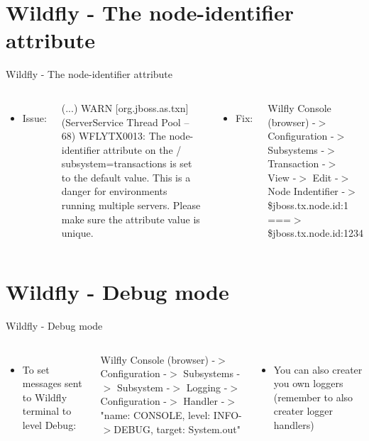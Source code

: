 \documentclass[aspectratio=1610,english]{beamer} %
\begin{document}
  	\section{Wildfly - The node-identifier attribute}
	\begin{frame}{Wildfly - The node-identifier attribute}
		\begin{columns}
				\begin{itemize}
					\tiny
					\color{black}
					\item Issue:
				\end{itemize}
				\fontsize{4}{5} \selectfont
				(...) WARN  [org.jboss.as.txn] (ServerService Thread 	Pool -- 68) WFLYTX0013: The node-identifier attribute on the /	subsystem=transactions is set to the default value. This is a 	danger for environments running multiple servers. Please make sure the attribute value is unique.
				
				\begin{itemize}
					\tiny
					\color{black}
					\item Fix:
				\end{itemize}
				\fontsize{4}{5} \selectfont
				Wilfly Console (browser) -$>$ Configuration -$>$ Subsystems -$>$ 	Transaction -$>$ View -$>$ Edit -$>$ Node Indentifier -$>$ 
	\${jboss.tx.node.id:1} ===$>$ \${jboss.tx.node.id:1234}
		\end{columns}
	\end{frame}
  	\section{Wildfly - Debug mode}
	\begin{frame}{Wildfly - Debug mode}
		\begin{columns}
			\column{0.5\textwidth \color{gray}}
				
				\begin{itemize}
					\tiny
					\color{black}
					\item To set messages sent to Wildfly terminal to level Debug:
				\end{itemize}
				\fontsize{4}{5} \selectfont
				Wilfly Console (browser) -$>$ Configuration -$>$ Subsystems -$>$ Subsystem -$>$ Logging -$>$ Configuration -$>$ Handler -$>$ \\
	"name: CONSOLE, level: INFO-$>$DEBUG, target: System.out"
				\begin{itemize}
					\tiny
					\color{black}
					\item You can also creater you own loggers (remember to also creater logger handlers)
				\end{itemize}
		\end{columns}
	\end{frame}
\end{document}
